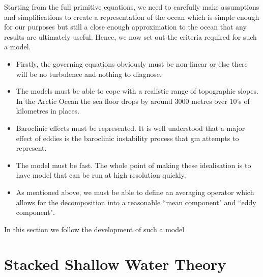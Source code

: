 \documentclass[12pt,a4paper]{report}
\begin{document}
Starting from the full primitive equations, we need to carefully make assumptions and
simplifications to create a representation of the ocean which is simple enough for our
purposes but still a close enough approximation to the ocean that any results are ultimately
 useful. Hence, we now set out the criteria required for such a model.
 \begin{itemize}
 	\item Firstly, the governing equations obviously must be non-linear or else there will be
 	no turbulence and nothing to diagnose.
 	\item The models must be able to cope with a realistic range of topographic slopes.
 	In the Arctic Ocean the sea floor drops by around $3000$ metres over $10$'s of kilometres
 	in places.
 	\item Baroclinic effects must be represented. It is well understood that a major effect
 	of eddies is the baroclinic instability process that \gls{gm} attempts to represent.
 	\item The model must be fast. The whole point of making these idealisation is to have model
 	 that can be run at high resolution quickly.
 	 \item As mentioned above, we must be able to define an averaging operator which 
 	 allows for the decomposition into a reasonable ``mean component" and ``eddy component".
 \end{itemize}
In this section we follow the development of such a model 


\section{Stacked Shallow Water Theory}
\label{swtheory}
\end{document}
